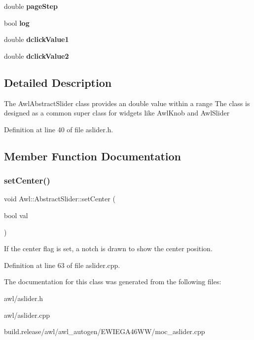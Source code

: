 \begin{DoxyCompactItemize}
\mbox{\label{class_awl_1_1_abstract_slider_a7f2147a687bd27698b537c5d77afbdea}} 
double {\bfseries page\+Step}
\item 
\mbox{\label{class_awl_1_1_abstract_slider_aef5992ce421372f6a94cdf1297e7202c}} 
bool {\bfseries log}
\item 
\mbox{\label{class_awl_1_1_abstract_slider_a650dcdcde0113be3f550bd39feb89940}} 
double {\bfseries dclick\+Value1}
\item 
\mbox{\label{class_awl_1_1_abstract_slider_a16100821bc00d050954b5cd08428d848}} 
double {\bfseries dclick\+Value2}
\end{DoxyCompactItemize}


\subsection{Detailed Description}
The Awl\+Abstract\+Slider class provides an double value within a range The class is designed as a common super class for widgets like Awl\+Knob and Awl\+Slider 

Definition at line 40 of file aslider.\+h.



\subsection{Member Function Documentation}
\mbox{\label{class_awl_1_1_abstract_slider_a4d634a84730200db18c9d7fe3873a993}} 
\subsubsection{\texorpdfstring{set\+Center()}{setCenter()}}
{\footnotesize\ttfamily void Awl\+::\+Abstract\+Slider\+::set\+Center (\begin{DoxyParamCaption}\item[{bool}]{val }\end{DoxyParamCaption})\hspace{0.3cm}{\ttfamily [virtual]}}

If the center flag is set, a notch is drawn to show the center position. 

Definition at line 63 of file aslider.\+cpp.



The documentation for this class was generated from the following files\+:\begin{DoxyCompactItemize}
\item 
awl/aslider.\+h\item 
awl/aslider.\+cpp\item 
build.\+release/awl/awl\+\_\+autogen/\+E\+W\+I\+E\+G\+A46\+W\+W/moc\+\_\+aslider.\+cpp\end{DoxyCompactItemize}
